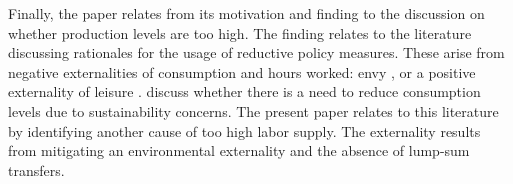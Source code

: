 Finally, the paper relates from its motivation and finding to the discussion on whether production levels are too high. 
The finding relates to the literature discussing rationales for the usage of reductive policy measures. These arise from negative externalities of consumption and hours worked: 
envy \cite{Alvarez-Cuadrado2007EnvyHours}, or a positive externality of leisure \cite{Alesina2005WorkDifferent}. \cite{Arrow2004AreMuch} discuss whether there is a need to reduce consumption levels due to sustainability concerns. 
 The present paper relates to this literature by identifying another cause of too high labor supply. The externality results from mitigating an environmental externality and the absence of lump-sum transfers.
